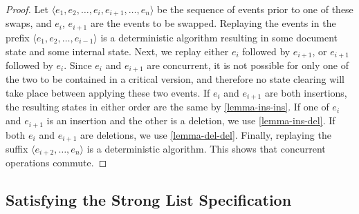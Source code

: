 \documentclass[sigplan,10pt]{acmart}
\begin{document}
\begin{proof}
  Let $\langle e_1, e_2, \dots, e_i, e_{i+1}, \dots, e_n \rangle$ be the sequence of events prior to one of these swaps, and $e_i$, $e_{i+1}$ are the events to be swapped.
  Replaying the events in the prefix $\langle e_1, e_2, \dots, e_{i-1} \rangle$ is a deterministic algorithm resulting in some document state and some internal state.
  Next, we replay either $e_i$ followed by $e_{i+1}$, or $e_{i+1}$ followed by $e_i$.
  Since $e_i$ and $e_{i+1}$ are concurrent, it is not possible for only one of the two to be contained in a critical version, and therefore no state clearing will take place between applying these two events.
  If $e_i$ and $e_{i+1}$ are both insertions, the resulting states in either order are the same by \autoref{lemma-ins-ins}.
  If one of $e_i$ and $e_{i+1}$ is an insertion and the other is a deletion, we use \autoref{lemma-ins-del}.
  If both $e_i$ and $e_{i+1}$ are deletions, we use \autoref{lemma-del-del}.
  Finally, replaying the suffix $\langle e_{i+2}, \dots, e_n \rangle$ is a deterministic algorithm.
  This shows that concurrent operations commute.
\end{proof}

\subsection{Satisfying the Strong List Specification}
\end{document}
